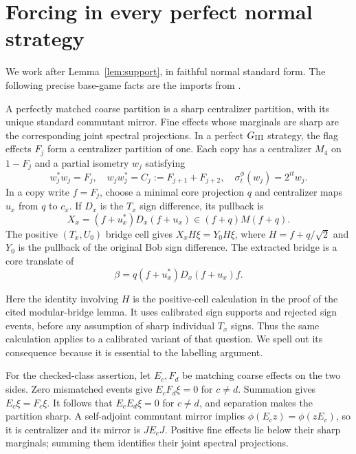 \section{Forcing in every perfect normal strategy}\label{sec:forcing}
We work after Lemma~\ref{lem:support}, in faithful normal standard form. The following precise base-game facts are the imports from \cite[Lemmas 2.1 and 2.2, and Section 2]{TypeGames}.

\begin{lemma}\label{lem:base}
A perfectly matched coarse partition is a sharp centralizer partition, with its unique standard commutant mirror. Fine effects whose marginals are sharp are the corresponding joint spectral projections. In a perfect $G_{\mathrm{III}}$ strategy, the flag effects $F_j$ form a centralizer partition of one. Each copy has a centralizer $M_4$ on $1-F_j$ and a partial isometry $w_j$ satisfying
\begin{equation}\label{eq:bridge}
 w_j^*w_j=F_j,\quad w_jw_j^*=C_j:=F_{j+1}+F_{j+2},
 \quad \sigma_t^\phi(w_j)=2^{it}w_j.
\end{equation}
In a copy write $f=F_j$, choose a minimal core projection $q$ and centralizer maps $u_x$ from $q$ to $c_x$. If $D_x$ is the $T_x$ sign difference, its pullback is
\[
 X_x=(f+u_x^*)D_x(f+u_x)\in(f+q)M(f+q).
\]
The positive $(T_x,U_0)$ bridge cell gives $X_xH\xi=Y_0H\xi$, where $H=f+q/\sqrt2$ and $Y_0$ is the pullback of the original Bob sign difference. The extracted bridge is a core translate of
\begin{equation}\label{eq:beta}
 \beta=q(f+u_x^*)D_x(f+u_x)f.
\end{equation}
\end{lemma}
Here the identity involving $H$ is the positive-cell calculation in the proof of the cited modular-bridge lemma. It uses calibrated sign supports and rejected sign events, before any assumption of sharp individual $T_x$ signs. Thus the same calculation applies to a calibrated variant of that question. We spell out its consequence because it is essential to the labelling argument.

For the checked-class assertion, let $E_c,F_d$ be matching coarse effects on the two sides. Zero mismatched events give $E_cF_d\xi=0$ for $c\ne d$. Summation gives $E_c\xi=F_c\xi$. It follows that $E_cE_d\xi=0$ for $c\ne d$, and separation makes the partition sharp. A self-adjoint commutant mirror implies $\phi(E_cz)=\phi(zE_c)$, so it is centralizer and its mirror is $JE_cJ$. Positive fine effects lie below their sharp marginals; summing them identifies their joint spectral projections.

